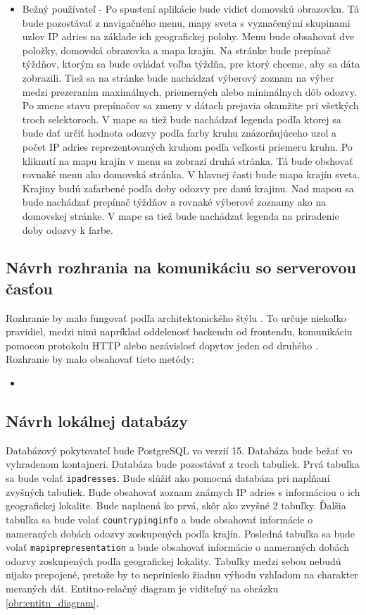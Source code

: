 \begin{itemize}
    \item Bežný používateľ - Po spustení aplikácie bude vidieť domovskú obrazovku. Tá bude pozostávať z navigačného menu, mapy sveta s vyznačenými skupinami 
    uzlov IP adries na základe ich geografickej polohy. Menu bude obsahovať dve položky, domovská obrazovka a mapa krajín. Na stránke bude prepínač týždňov, 
    ktorým sa bude ovládať voľba týždňa, pre ktorý chceme, aby sa dáta zobrazili. Tiež sa na stránke bude nachádzať výberový zoznam na výber medzi prezeraním 
    maximálnych, priemerných alebo minimálnych dôb odozvy. Po zmene stavu prepínačov sa zmeny v dátach prejavia okamžite pri všetkých troch selektoroch. 
    V mape sa tiež bude nachádzať legenda podľa ktorej sa bude dať určiť hodnota odozvy podľa farby kruhu znázorňujúceho uzol a počet IP adries reprezentovaných 
    kruhom podľa veľkosti priemeru kruhu.
    Po kliknutí na mapu krajín v menu sa zobrazí druhá stránka. Tá bude obshovať rovnaké menu ako domovská stránka. V hlavnej časti bude mapa krajín sveta. 
    Krajiny budú zafarbené podľa doby odozvy pre danú krajinu. Nad mapou sa bude nachádzať prepínač týždňov a rovnaké výberové zoznamy ako na domovskej stránke. 
    V mape sa tiež bude nachádzať legenda na priradenie doby odozvy k farbe.
\end{itemize}

\subsection{Návrh rozhrania na komunikáciu so serverovou časťou}
Rozhranie by malo fungovať podľa architektonického štýlu . To určuje niekoľko pravidiel, medzi nimi napríklad oddelenosť backendu od frontendu, 
komunikáciu pomocou protokolu HTTP alebo nezávislosť dopytov jeden od druhého \cite{rest}. Rozhranie by malo obsahovať tieto metódy:
\begin{itemize}
    \item 
\end{itemize}

\subsection{Návrh lokálnej databázy}
Databázový pokytovateľ bude PostgreSQL vo verzií 15. Databáza bude bežať vo vyhradenom kontajneri. Databáza bude pozostávať z troch tabuliek. Prvá tabuľka 
sa bude volať \lstinline{ipadresses}. Bude slúžiť ako pomocná databáza pri napĺňaní zvyšných tabuliek. Bude obsahovať zoznam známych IP adries s informáciou 
o ich geografickej lokalite. Bude naplnená ko prvá, skôr ako zvyšné 2 tabuľky. Ďalšia tabuľka sa bude volať \lstinline{countrypinginfo} a bude obsahovať 
informácie o nameraných dobách odozvy zoskupených podľa krajín. Posledná tabuľka sa bude volať \lstinline{mapiprepresentation} a bude obsahovať informácie o nameraných dobách 
odozvy zoskupených podľa geografickej lokality. Tabuľky medzi sebou nebudú nijako prepojené, pretože by to neprinieslo žiadnu výhodu vzhľadom na charakter 
meraných dát. Entitno-relačný diagram je viditeľný na obrázku \ref{obr:entitn_diagram}.

